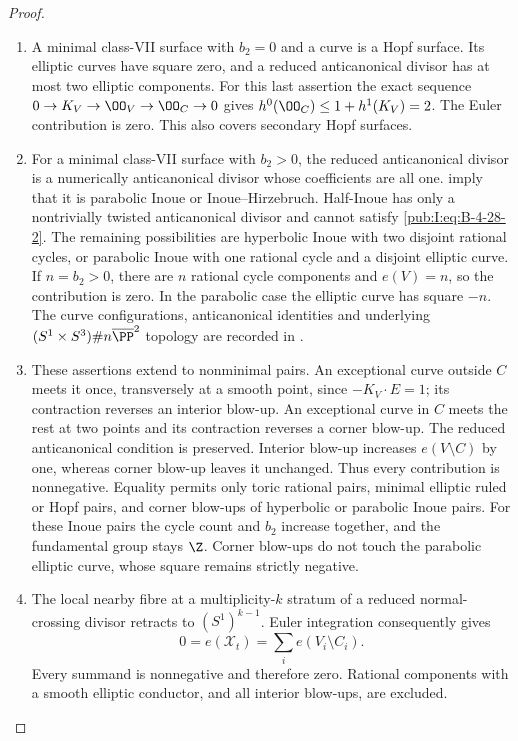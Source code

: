 \begin{proof}
\begin{enumerate}[label=\arabic*.,leftmargin=*]
\item A minimal class-VII surface with $b_2=0$ and a curve is
a Hopf surface. Its elliptic curves have square zero,
and a reduced anticanonical divisor has at most two
elliptic components. For this last assertion the exact
sequence $0\to K_V\to\OO_V\to\OO_C\to0$ gives
$h^0(\OO_C)\le1+h^1(K_V)=2$.
The Euler contribution is zero. This also covers
secondary Hopf surfaces.

\item For a minimal class-VII surface with $b_2>0$, the
reduced anticanonical divisor is a numerically
anticanonical divisor whose coefficients are all one.
\citet[arXiv version~3, Corollary~2.25, pp.~16--17; Lemma~2.26, p.~17; Proposition~2.27, pp.~17--19]{Dloussky2005AB} imply that it is parabolic Inoue
or Inoue--Hirzebruch. Half-Inoue has only a nontrivially
twisted anticanonical divisor and cannot satisfy
\eqref{pub:I:eq:B-4-28-2}. The remaining possibilities are hyperbolic
Inoue with two disjoint rational cycles, or parabolic
Inoue with one rational cycle and a disjoint elliptic
curve. If $n=b_2>0$, there are $n$ rational cycle
components and $e(V)=n$, so the contribution is zero.
In the parabolic case the elliptic curve has square
$-n$. The curve configurations, anticanonical identities
and underlying $(S^1\times S^3)\#n\overline{\PP}^2$
topology are recorded in
\citet[Sections~3.2--3.3, pp.~20--22]{FujikiPontecorvo2010AB}.

\item These assertions extend to nonminimal pairs. An
exceptional curve outside $C$ meets it once, transversely
at a smooth point, since $-K_V\cdot E=1$; its contraction
reverses an interior blow-up. An exceptional curve in
$C$ meets the rest at two points and its contraction
reverses a corner blow-up. The reduced anticanonical
condition is preserved. Interior blow-up increases
$e(V\setminus C)$ by one, whereas corner blow-up leaves
it unchanged. Thus every contribution is nonnegative.
Equality permits only toric rational pairs, minimal
elliptic ruled or Hopf pairs, and corner blow-ups of
hyperbolic or parabolic Inoue pairs. For these Inoue
pairs the cycle count and $b_2$ increase together, and
the fundamental group stays $\Z$. Corner blow-ups do
not touch the parabolic elliptic curve, whose square
remains strictly negative.

\item The local nearby fibre at a multiplicity-$k$ stratum
of a reduced normal-crossing divisor retracts to
$(S^1)^{k-1}$. Euler integration consequently gives
\begin{equation}
 0=e(\mathcal X_t)=\sum_i e(V_i\setminus C_i).
\label{pub:I:eq:B-4-28-4}
\end{equation}
Every summand is nonnegative and therefore zero.
Rational components with a smooth elliptic conductor,
and all interior blow-ups, are excluded.


\end{enumerate}
\end{proof}
